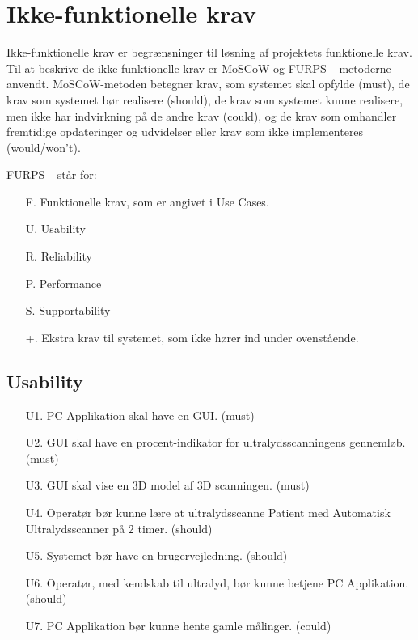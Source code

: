 \chapter{Ikke-funktionelle krav}\label{Ikkefunktionellekrav}

Ikke-funktionelle krav er begrænsninger til løsning af projektets funktionelle krav. Til at beskrive de ikke-funktionelle krav er MoSCoW og FURPS+ metoderne anvendt. 
MoSCoW-metoden betegner krav, som systemet skal opfylde (must), de krav som systemet bør realisere (should), de krav som systemet kunne realisere, men ikke har indvirkning på de andre krav (could), og de krav som omhandler fremtidige opdateringer og udvidelser eller krav som ikke implementeres  (would/won't).
  
FURPS+ står for:
\begin{enumerate}
\item[F.] Funktionelle krav, som er angivet i Use Cases.
\item[U.] Usability
\item[R.] Reliability
\item[P.] Performance 
\item[S.] Supportability 
\item[+.] Ekstra krav til systemet, som ikke hører ind under ovenstående. 
\end{enumerate}

\section{Usability}
\begin{enumerate}
    \item[U1.] PC Applikation skal have en GUI. (must)
    \item[U2.] GUI skal have en procent-indikator for ultralydsscanningens gennemløb. (must)
    \item[U3.] GUI skal vise en 3D model af 3D scanningen. (must)
    \item[U4.] Operatør bør kunne lære at ultralydsscanne Patient med Automatisk Ultralydsscanner på 2 timer. (should)
    \item[U5.] Systemet bør have en brugervejledning.  (should)  
    \item[U6.] Operatør, med kendskab til ultralyd, bør kunne betjene PC Applikation. (should)
    \item[U7.] PC Applikation bør kunne hente gamle målinger. (could)
\end{enumerate}

